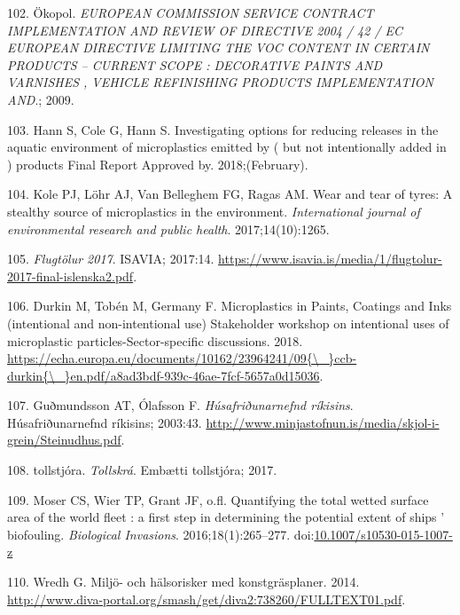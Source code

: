 \documentclass[icelandic,]{book}
\begin{document}
\leavevmode\hypertarget{ref-Commission2009}{}%
102. Ökopol. \emph{EUROPEAN COMMISSION SERVICE CONTRACT IMPLEMENTATION AND REVIEW OF DIRECTIVE 2004 / 42 / EC EUROPEAN DIRECTIVE LIMITING THE VOC CONTENT IN CERTAIN PRODUCTS -- CURRENT SCOPE : DECORATIVE PAINTS AND VARNISHES , VEHICLE REFINISHING PRODUCTS IMPLEMENTATION AND}.; 2009.

\leavevmode\hypertarget{ref-Hann2018}{}%
103. Hann S, Cole G, Hann S. Investigating options for reducing releases in the aquatic environment of microplastics emitted by ( but not intentionally added in ) products Final Report Approved by. 2018;(February).

\leavevmode\hypertarget{ref-kole2017wear}{}%
104. Kole PJ, Löhr AJ, Van Belleghem FG, Ragas AM. Wear and tear of tyres: A stealthy source of microplastics in the environment. \emph{International journal of environmental research and public health}. 2017;14(10):1265.

\leavevmode\hypertarget{ref-isavia2017}{}%
105. \emph{Flugtölur 2017}. ISAVIA; 2017:14. \url{https://www.isavia.is/media/1/flugtolur-2017-final-islenska2.pdf}.

\leavevmode\hypertarget{ref-Durkin2018}{}%
106. Durkin M, Tobén M, Germany F. Microplastics in Paints, Coatings and Inks (intentional and non-intentional use) Stakeholder workshop on intentional uses of microplastic particles-Sector-specific discussions. 2018. \href{https://echa.europa.eu/documents/10162/23964241/09\%7B/_\%7Dccb-durkin\%7B/_\%7Den.pdf/a8ad3bdf-939c-46ae-7fcf-5657a0d15036}{https://echa.europa.eu/documents/10162/23964241/09\{\textbackslash{}\_\}ccb-durkin\{\textbackslash{}\_\}en.pdf/a8ad3bdf-939c-46ae-7fcf-5657a0d15036}.

\leavevmode\hypertarget{ref-Guuxf0mundsson2003}{}%
107. Guðmundsson AT, Ólafsson F. \emph{Húsafriðunarnefnd ríkisins}. Húsafriðunarnefnd ríkisins; 2003:43. \url{http://www.minjastofnun.is/media/skjol-i-grein/Steinudhus.pdf}.

\leavevmode\hypertarget{ref-tollur2017}{}%
108. tollstjóra. \emph{Tollskrá}. Embætti tollstjóra; 2017.

\leavevmode\hypertarget{ref-Moser2016}{}%
109. Moser CS, Wier TP, Grant JF, o.fl. Quantifying the total wetted surface area of the world fleet : a first step in determining the potential extent of ships ' biofouling. \emph{Biological Invasions}. 2016;18(1):265--277. doi:\href{https://doi.org/10.1007/s10530-015-1007-z}{10.1007/s10530-015-1007-z}

\leavevmode\hypertarget{ref-Wredh2014}{}%
110. Wredh G. Miljö- och hälsorisker med konstgräsplaner. 2014. \url{http://www.diva-portal.org/smash/get/diva2:738260/FULLTEXT01.pdf}.
\end{document}

